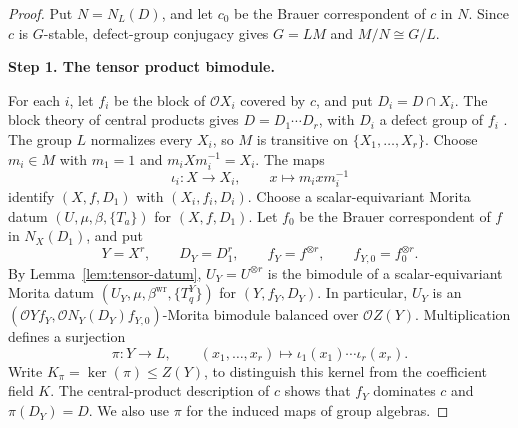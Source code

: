 \documentclass[11pt,a4paper]{article}
\theoremstyle{definition}
\theoremstyle{remark}
\numberwithin{equation}{section}
\newcommand{\cO}{\mathcal{O}}
\newcommand{\proofstep}[1]{%
	\par\addvspace{\medskipamount}%
	\noindent\textbf{#1}\par\nobreak
	\smallskip\nobreak\noindent\ignorespaces
}
\begin{document}
	\begin{proof}
		Put $N=N_L(D)$, and let $c_0$ be the Brauer correspondent of $c$
		in $N$. Since $c$ is $G$-stable, defect-group conjugacy gives
		$G=LM$ and $M/N\cong G/L$.
		\proofstep{Step 1. The tensor product bimodule.}
		For each $i$, let $f_i$ be the block of $\cO X_i$ covered by $c$,
		and put $D_i=D\cap X_i$. The block theory of central products
		gives $D=D_1\cdots D_r$, with $D_i$ a defect group of $f_i$
		\cite[Lemma~7.5(i)]{Sambale2014}.
		The group $L$ normalizes every $X_i$, so $M$ is transitive on
		$\{X_1,\ldots,X_r\}$. Choose $m_i\in M$ with $m_1=1$ and
		$m_iXm_i^{-1}=X_i$. The maps
		\[
		\iota_i:X\longrightarrow X_i,\qquad x\longmapsto m_ixm_i^{-1}
		\]
		identify $(X,f,D_1)$ with $(X_i,f_i,D_i)$.
		Choose a scalar-equivariant Morita datum
		$(U,\mu,\beta,\{T_a\})$ for $(X,f,D_1)$.
		Let $f_0$ be the Brauer correspondent of $f$ in $N_X(D_1)$, and put
		\[
		Y=X^r,\qquad D_Y=D_1^r,\qquad
		f_Y=f^{\otimes r},\qquad f_{Y,0}=f_0^{\otimes r}.
		\]
		By Lemma~\ref{lem:tensor-datum}, $U_Y=U^{\otimes r}$ is the
		bimodule of a scalar-equivariant Morita datum
		$(U_Y,\mu,\beta^{\mathrm{wr}},\{T^Y_q\})$ for $(Y,f_Y,D_Y)$.
		In particular, $U_Y$ is an
		$(\cO Yf_Y,\cO N_Y(D_Y)f_{Y,0})$-Morita bimodule balanced over
		$\cO Z(Y)$.
		Multiplication defines a surjection
		\[
		\pi:Y\longrightarrow L,\qquad
		(x_1,\ldots,x_r)\longmapsto\iota_1(x_1)\cdots\iota_r(x_r).
		\]
		Write $K_\pi=\ker(\pi)\leq Z(Y)$, to distinguish this kernel
		from the coefficient field $K$. The central-product description
		of $c$ shows that $f_Y$ dominates $c$ and $\pi(D_Y)=D$.
		We also use $\pi$ for the induced maps of group algebras.
		

\end{proof}
\end{document}
